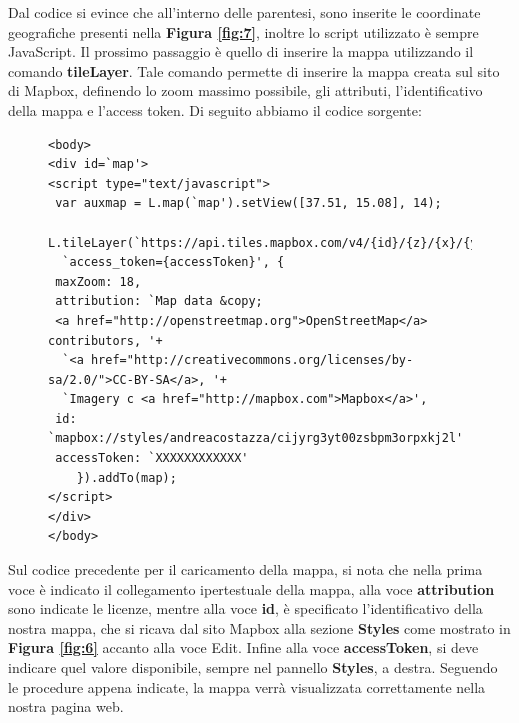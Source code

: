 \documentclass[a4paper,11pt]{article}
\begin{document}
Dal codice si evince che all'interno delle parentesi, sono inserite le coordinate geografiche presenti nella \textbf{Figura \ref{fig:7}}, inoltre lo script utilizzato è sempre JavaScript.
Il prossimo passaggio è quello di inserire la mappa utilizzando il comando \textbf{tileLayer}. Tale comando permette di inserire la mappa creata sul sito di Mapbox, definendo lo zoom massimo possibile, gli attributi, l'identificativo della mappa e l'access token. Di seguito abbiamo il codice sorgente:
\begin{figure}[htb]
\begin{lstlisting}[style=htmlcssjs]
<body>		
<div id=`map'>
<script type="text/javascript">
 var auxmap = L.map(`map').setView([37.51, 15.08], 14);
 L.tileLayer(`https://api.tiles.mapbox.com/v4/{id}/{z}/{x}/{y}.png?'+ 
  `access_token={accessToken}', {
 maxZoom: 18,
 attribution: `Map data &copy; 
 <a href="http://openstreetmap.org">OpenStreetMap</a> contributors, '+
  `<a href="http://creativecommons.org/licenses/by-sa/2.0/">CC-BY-SA</a>, '+
  `Imagery c <a href="http://mapbox.com">Mapbox</a>',
 id: `mapbox://styles/andreacostazza/cijyrg3yt00zsbpm3orpxkj2l'
 accessToken: `XXXXXXXXXXXX'
	}).addTo(map);
</script>
</div>
</body>
\end{lstlisting}
\end{figure}
\newpage
Sul codice precedente per il caricamento della mappa, si nota che nella prima voce è indicato il collegamento ipertestuale della mappa, alla voce \textbf{attribution} sono indicate le licenze, mentre alla voce \textbf{id}, è specificato l'identificativo della nostra mappa, che si ricava dal sito Mapbox alla sezione \textbf{Styles} come mostrato in \textbf{Figura \ref{fig:6}} accanto alla voce Edit.
Infine alla voce \textbf{accessToken}, si deve indicare quel valore disponibile, sempre nel pannello \textbf{Styles}, a destra. \newline
Seguendo le procedure appena indicate, la mappa verrà visualizzata correttamente nella nostra pagina web.
\end{document}
